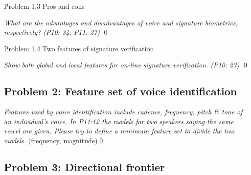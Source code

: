 \documentclass[
        ]{beamer}
\begin{document}
    		\begin{frame}[t]{Problem 1.3 Pros and cons}    		
    			\begin{overprint}
    			\emph{What are the advantages and disadvantages of voice and signature biometrics, respectively? (P10: 34; P11: 27)}
    			\onslide<2> 
    			\onslide<3> \qed	
    			\end{overprint}
    		\end{frame}
    
    		\begin{frame}[t]{Problem 1.4 Two features of signature verification}    		
    			\begin{overprint}
    			\onslide<1>
    			\emph{Show both global and local features for on-line signature verification.  (P10: 23)}
    			\onslide<2> \inpdfc{10}{23}\qed	
    			\end{overprint}
    		\end{frame}
    		
    \subsection{Problem 2: Feature set of voice identification}
    
    		\begin{frame}[t]{\subsecname}
    			\begin{overprint}
    			\emph{Features used by voice identification include cadence, frequency, pitch \& tone of an individual's voice. In P11:12 the models for two speakers saying the same vowel are given. Please try to define a minimum feature set to divide the two models.}
    			\onslide<2> \inpdfc{11}{12}
    			\alert{(frequency, magnitude)}\qed	
    			\end{overprint}
    		\end{frame}
    		
    \subsection{Problem 3: Directional frontier}
    
\end{document}

